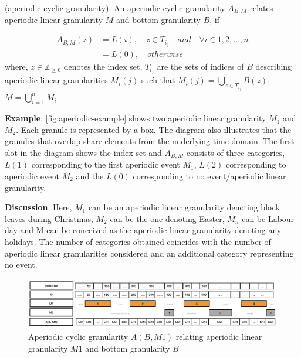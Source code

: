 \documentclass[12pt]{article}
\begin{document}
\begin{definition}\label{aperiodic}
(aperiodic cyclic granularity): An aperiodic cyclic granularity $A_{B, M}$ relates aperiodic linear granularity $M$ and bottom granularity $B$, if

\begin{equation}\label{eq:aperiodic}
\begin{split}
A_{B, M}(z) & = L(i), \quad z \in T_{i_j} \quad and \quad \forall i \in {1, 2, \dots, n}\\
     & = L(0), \quad otherwise
\end{split}     
\end{equation}
where, 
$z \in \mathbb{Z}_{\geq 0}$ denotes the index set,
$T_{i_j}$ are the sets of indices of $B$ describing aperiodic linear granularities $M_{i}(j)$ such that $M_{i}(j) = \bigcup_{z \in T_{i_j}}B(z)$, $M = \bigcup_{i=1}^{n}M_{i}$.
\end{definition}

\textbf{Example}: \autoref{fig:aperiodic-example} shows two aperiodic linear granularity \(M_1\) and \(M_2\). Each granule is represented by a box. The diagram also illustrates that the granules that overlap share elements from the underlying time domain. The first slot in the diagram shows the index set and \(A_{B, M}\) consists of three categories, \(L(1)\) corresponding to the first aperiodic event \(M_1\), \(L(2)\) corresponding to aperiodic event \(M_2\) and the \(L(0)\) corresponding to no event/aperiodic linear granularity.

\textbf{Discussion}: Here, \(M_1\) can be an aperiodic linear granularity denoting block leaves during Christmas, \(M_2\) can be the one denoting Easter, \(M_n\) can be Labour day and M can be conceived as the aperiodic linear granularity denoting any holidays. The number of categories obtained coincides with the number of aperiodic linear granularities considered and an additional category representing no event.

\begin{figure}

{\centering \includegraphics[width=1\linewidth]{Figs/aperiodic-example} 

}

\caption{Aperiodic cyclic granularity $A(B, M1)$ relating aperiodic linear granularity $M1$ and bottom granularity $B$}\label{fig:aperiodic-example}
\end{figure}
\end{document}
